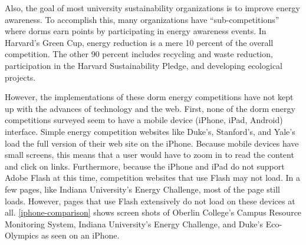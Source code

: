 Also, the goal of most university sustainability organizations is to improve energy awareness.  To accomplish this, many organizations have ``sub-competitions'' where dorms earn points by participating in energy awareness events.  In Harvard's Green Cup\cite{harvard-greencup}, energy reduction is a mere 10 percent of the overall competition. The other 90 percent includes recycling and waste reduction, participation in the Harvard Sustainability Pledge, and developing ecological projects.

However, the implementations of these dorm energy competitions have not kept up with the advances of technology and the web.  First, none of the dorm energy competitions surveyed seem to have a mobile device (iPhone, iPad, Android) interface.  Simple energy competition websites like Duke's, Stanford's, and Yale's load the full version of their web site on the iPhone.  Because mobile devices have small screens, this means that a user would have to zoom in to read the content and click on links.  Furthermore, because the iPhone and iPad do not support Adobe Flash at this time, competition websites that use Flash may not load.  In a few pages, like Indiana University's Energy Challenge, most of the page still loads.  However, pages that use Flash extensively do not load on these devices at all.  \autoref{iphone-comparison} shows screen shots of Oberlin College's Campus Resource Monitoring System, Indiana University's Energy Challenge,  and Duke's Eco-Olympics as seen on an iPhone.

